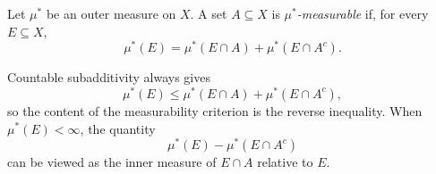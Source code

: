 \begin{definition}
  Let $\mu^*$ be an outer measure on $X$. A set $A\subseteq X$ is
  \emph{$\mu^*$-measurable} if, for every $E\subseteq X$,
  \[
    \mu^*(E)
    =\mu^*(E\cap A)+\mu^*(E\cap A^c).
  \]
\end{definition}

Countable subadditivity always gives
\[
  \mu^*(E)
  \leq\mu^*(E\cap A)+\mu^*(E\cap A^c),
\]
so the content of the measurability criterion is the reverse inequality.
When $\mu^*(E)<\infty$, the quantity
\[
  \mu^*(E)-\mu^*(E\cap A^c)
\]
can be viewed as the inner measure of $E\cap A$ relative to $E$.
